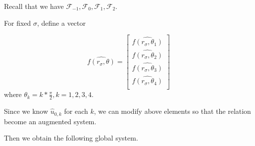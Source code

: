 Recall that we have $\mathcal{F}_{-1}, \mathcal{F}_{0}, \mathcal{F}_{1}, \mathcal{F}_{2}$.

For fixed $\sigma$, define a vector

\begin{equation}
\widehat{f(r_\sigma,\theta)}= \begin{bmatrix}
                                \widehat{f(r_\sigma,\theta_1)} \\
                                \widehat{f(r_\sigma,\theta_2)} \\
                                \widehat{f(r_\sigma,\theta_3)} \\
                                \widehat{f(r_\sigma,\theta_4)} \\
                              \end{bmatrix}
\end{equation}
where $\theta_k = k * \frac{\pi}{2}, k=1,2,3,4$.

Since we know $\hat u_{0, k}$ for each $k$, we can modify above
elements so that the relation become an augmented system.

Then we obtain the following global system.

